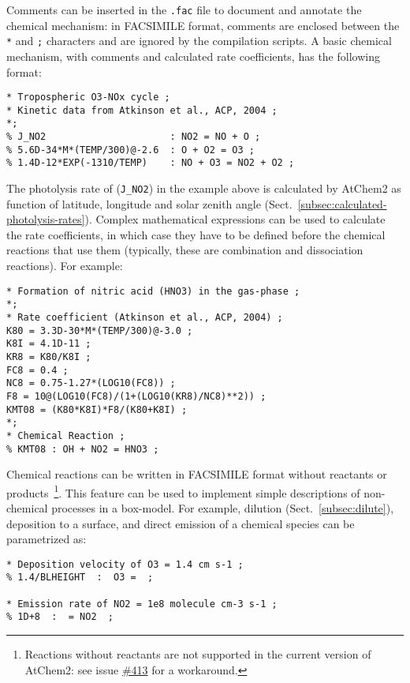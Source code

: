 Comments can be inserted in the \texttt{.fac} file to document and
annotate the chemical mechanism: in FACSIMILE format, comments are
enclosed between the \texttt{*} and \texttt{;} characters and are
ignored by the compilation scripts. A basic chemical mechanism, with
comments and calculated rate coefficients, has the following format:

\begin{verbatim}
* Tropospheric O3-NOx cycle ;
* Kinetic data from Atkinson et al., ACP, 2004 ;
*;
% J_NO2                      : NO2 = NO + O ;
% 5.6D-34*M*(TEMP/300)@-2.6  : O + O2 = O3 ;
% 1.4D-12*EXP(-1310/TEMP)    : NO + O3 = NO2 + O2 ;
\end{verbatim}

The photolysis rate of  (\texttt{J\_NO2}) in the example above
is calculated by AtChem2 as function of latitude, longitude and solar
zenith angle (Sect.~\ref{subsec:calculated-photolysis-rates}).
Complex mathematical expressions can be used to calculate the rate
coefficients, in which case they have to be defined before the
chemical reactions that use them (typically, these are combination and
dissociation reactions). For example:

\begin{verbatim}
* Formation of nitric acid (HNO3) in the gas-phase ;
*;
* Rate coefficient (Atkinson et al., ACP, 2004) ;
K80 = 3.3D-30*M*(TEMP/300)@-3.0 ;
K8I = 4.1D-11 ;
KR8 = K80/K8I ;
FC8 = 0.4 ;
NC8 = 0.75-1.27*(LOG10(FC8)) ;
F8 = 10@(LOG10(FC8)/(1+(LOG10(KR8)/NC8)**2)) ;
KMT08 = (K80*K8I)*F8/(K80+K8I) ;
*;
* Chemical Reaction ;
% KMT08 : OH + NO2 = HNO3 ;
\end{verbatim}

Chemical reactions can be written in FACSIMILE format without
reactants or products~\footnote{Reactions without reactants are not
  supported in the current version of AtChem2: see issue
  \href{https://github.com/AtChem/AtChem2/issues/413}{\#413} for a
  workaround.}. This feature can be used to implement simple
descriptions of non-chemical processes in a box-model. For example,
dilution (Sect.~\ref{subsec:dilute}), deposition to a surface, and
direct emission of a chemical species can be parametrized as:

\begin{verbatim}
* Deposition velocity of O3 = 1.4 cm s-1 ;
% 1.4/BLHEIGHT  :  O3 =  ;

* Emission rate of NO2 = 1e8 molecule cm-3 s-1 ;
% 1D+8  :  = NO2  ;
\end{verbatim}

